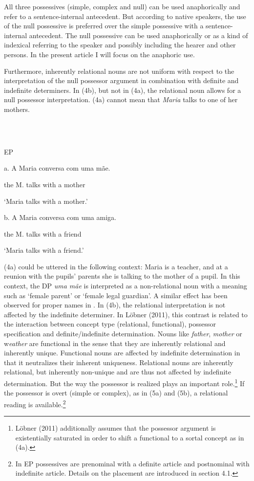 \documentclass[output=paper]{langsci/langscibook}
\begin{document}
All three possessives (simple, complex and null) can be used anaphorically and refer to a sentence-internal antecedent. But according to native speakers, the use of the null possessive is preferred over the simple possessive with a sentence-internal antecedent. The null possessive can be used anaphorically or as a kind of indexical referring to the speaker and possibly including the hearer and other persons. In the present article I will focus on the anaphoric use.

Furthermore, inherently relational nouns are not uniform with respect to the interpretation of the null possessor argument in combination with definite and indefinite determiners. In (4b), but not in (4a), the relational noun allows for a null possessor interpretation. (4a) cannot mean that \textit{Maria} talks to one of her mothers.

\ea%
    \label{ex:key:4}
    \gll\\
        \\
    \glt
    \z

          EP

a.  A Maria conversa com uma mãe.

the M. talks with a mother

‘Maria talks with a mother.’

  b.  A Maria conversa com uma amiga.

the M. talks with a friend

‘Maria talks with a friend.’

(4a) could be uttered in the following context: Maria is a teacher, and at a reunion with the pupils’ parents she is talking to the mother of a pupil. In this context, the DP \textit{uma mãe} is interpreted as a non-relational noun with a meaning such as ‘female parent’ or ‘female legal guardian’. A similar effect has been observed for proper names in \citet{Longobardi1994}. In (4b), the relational interpretation is not affected by the indefinite determiner. In Löbner (2011), this contrast is related to the interaction between concept type (relational, functional), possessor specification and definite/indefinite determination. Nouns like \textit{father}, \textit{mother} or w\textit{eather} are functional in the sense that they are inherently relational and inherently unique. Functional nouns are affected by indefinite determination in that it neutralizes their inherent uniqueness. Relational nouns are inherently relational, but inherently non-unique and are thus not affected by indefinite determination. But the way the possessor is realized plays an important role.\footnote{Löbner (2011) additionally assumes that the possessor argument is existentially saturated in order to shift a functional to a sortal concept as in (4a).} If the possessor is overt (simple or complex), as in (5a) and (5b), a relational reading is available.\footnote{In EP possessives are prenominal with a definite article and postnominal with indefinite article. Details on the placement are introduced in section 4.1.}
\end{document}
